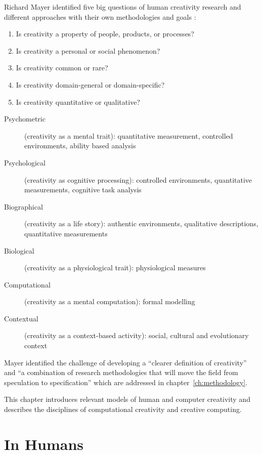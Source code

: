 Richard Mayer identified five big questions of human creativity research and different approaches with their own methodologies and goals \citeyear[p.450-451,453]{Mayer1999}:

\label{s:Mayer5questions}
\begin{enumerate}
  \item Is creativity a property of people, products, or processes?
  \item Is creativity a personal or social phenomenon?
  \item Is creativity common or rare?
  \item Is creativity domain-general or domain-specific?
  \item Is creativity quantitative or qualitative?
\end{enumerate}

\begin{description}
  \item [Psychometric] (creativity as a mental trait): quantitative measurement, controlled environments, ability based analysis
  \item [Psychological] (creativity as cognitive processing): controlled environments, quantitative measurements, cognitive task analysis
  \item [Biographical] (creativity as a life story): authentic environments, qualitative descriptions, quantitative measurements
  \item [Biological] (creativity as a physiological trait): physiological measures
  \item [Computational] (creativity as a mental computation): formal modelling
  \item [Contextual] (creativity as a context-based activity): social, cultural and evolutionary context
\end{description}

Mayer identified the challenge of developing a ``clearer definition of creativity'' and ``a combination of research methodologies that will move the field from speculation to specification'' \citeyear[p.459]{Mayer1999} which are addressed in chapter~\ref{ch:methodology}.

This chapter introduces relevant models of human and computer creativity and describes the disciplines of computational creativity and creative computing.


\section{In Humans}
\label{s:humancreativity}

